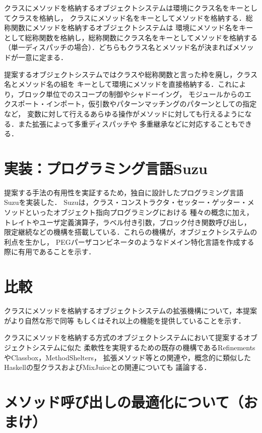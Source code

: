 \documentclass{ipsjprosym}
\begin{document}
クラスにメソッドを格納するオブジェクトシステムは環境にクラス名をキーとしてクラスを格納し，
クラスにメソッド名をキーとしてメソッドを格納する．総称関数にメソッドを格納するオブジェクトシステムは
環境にメソッド名をキーとして総称関数を格納し，総称関数にクラス名をキーとしてメソッドを格納する
（単一ディスパッチの場合）．どちらもクラス名とメソッド名が決まればメソッドが一意に定まる．

提案するオブジェクトシステムではクラスや総称関数と言った枠を廃し，クラス名とメソッド名の組を
キーとして環境にメソッドを直接格納する．これにより，ブロック単位でのスコープの制御やシャドーイング，
モジュールからのエクスポート・インポート，仮引数やパターンマッチングのパターンとしての指定など，
変数に対して行えるあらゆる操作がメソッドに対しても行えるようになる．また拡張によって多重ディスパッチや
多重継承などに対応することもできる．

\section{実装：プログラミング言語Suzu}

提案する手法の有用性を実証するため，独自に設計したプログラミング言語Suzuを実装した．
Suzuは，クラス・コンストラクタ・セッター・ゲッター・メソッドといったオブジェクト指向プログラミングにおける
種々の概念に加え，トレイトやユーザ定義演算子，ラベル付き引数，ブロック付き関数呼び出し，
限定継続などの機構を搭載している．これらの機構が，オブジェクトシステムの利点を生かし，
PEGパーザコンビネータのようなドメイン特化言語を作成する際に有用であることを示す．

\section{比較}

クラスにメソッドを格納するオブジェクトシステムの拡張機構について，本提案がより自然な形で同等
もしくはそれ以上の機能を提供していることを示す．

クラスにメソッドを格納する方式のオブジェクトシステムにおいて提案するオブジェクトシステムに似た
柔軟性を実現するための既存の機構であるRefinementsやClassbox，MethodShelters，
拡張メソッド等との関連や，概念的に類似したHaskellの型クラスおよびMixJuiceとの関連についても
議論する．

\section{メソッド呼び出しの最適化について（おまけ）}
\end{document}
